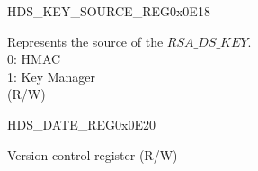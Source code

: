 \begin{register}{H}{DS\_KEY\_SOURCE\_REG}{0x0E18}\label{regdesc:DSKEYSOURCEREG}
%
%
\regnewline%
\begin{regdesc}\begin{reglist}
\label{fielddesc:DSKEYSOURCE}\item [DS\_KEY\_SOURCE] Represents the source of the \begin{math}RSA\_DS\_KEY\end{math}. \\
0: HMAC\\
1: Key Manager\\
(R/W)
\end{reglist}\end{regdesc}
\end{register}


\begin{register}{H}{DS\_DATE\_REG}{0x0E20}\label{regdesc:DSDATEREG}
%
%
\regnewline%
\begin{regdesc}\begin{reglist}
\label{fielddesc:DSDATE}\item [DS\_DATE] Version control register (R/W)
\end{reglist}\end{regdesc}
\end{register}
